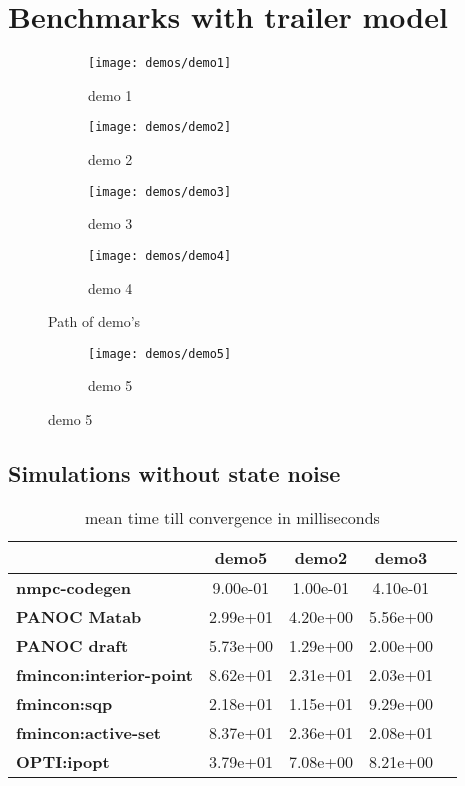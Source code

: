 \chapter{Benchmarks with trailer model}
\label{appendix:paths trailer simulations}

\begin{figure}[H]
	\centering
	\begin{subfigure}[b]{0.40\textwidth}
		\centering
		\texttt{[image: demos/demo1]}
		\caption{demo 1}
		\label{fig:demo 1}
	\end{subfigure}
	\hfill
	\begin{subfigure}[b]{0.40\textwidth}
		\centering
		\texttt{[image: demos/demo2]}
		\caption{demo 2}
		\label{fig:demo 2}
	\end{subfigure}
	\begin{subfigure}[b]{0.40\textwidth}
		\centering
		\texttt{[image: demos/demo3]}
		\caption{demo 3}
		\label{fig:demo 3}
	\end{subfigure}
	\hfill
	\begin{subfigure}[b]{0.40\textwidth}
		\centering
		\texttt{[image: demos/demo4]}
		\caption{demo 4}
		\label{fig:demo 4}
	\end{subfigure}
	\caption{Path of demo's}
	\label{fig:demos}
\end{figure}
\begin{figure}[H]
	\centering
	\begin{subfigure}[b]{0.45\textwidth}
		\centering
		\texttt{[image: demos/demo5]}
		\caption{demo 5}
		\label{fig:demo 5}
	\end{subfigure}
\end{figure}

\section{Simulations without state noise}
\label{appendix:benchmarks trailer without noise}

\begin{table}[H]
	\centering
	\begin{tabular}{|l|c|c|c|c|}
		\hline
		&\textbf{demo5}&\textbf{demo2}&\textbf{demo3}\\\hline
		\textbf{nmpc-codegen}&9.00e-01&1.00e-01&4.10e-01\\\hline
		\textbf{PANOC Matab}&2.99e+01&4.20e+00&5.56e+00\\\hline
		\textbf{PANOC draft}&5.73e+00&1.29e+00&2.00e+00\\\hline
		\textbf{fmincon:interior-point}&8.62e+01&2.31e+01&2.03e+01\\\hline
		\textbf{fmincon:sqp}&2.18e+01&1.15e+01&9.29e+00\\\hline
		\textbf{fmincon:active-set}&8.37e+01&2.36e+01&2.08e+01\\\hline
		\textbf{OPTI:ipopt}&3.79e+01&7.08e+00&8.21e+00\\\hline
	\end{tabular}
	\caption{mean time till convergence in milliseconds}
	\label{tbl:mean time till convergence}
\end{table}

